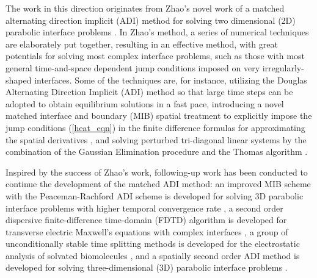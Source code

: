 \documentclass[dissertation]{uathesis}
\begin{document}
\begin{body}
The work in this direction originates from Zhao's novel work of a matched alternating direction implicit (ADI) method for solving two dimensional (2D) parabolic interface problems \cite{zhao2015matched}. In Zhao's method, a series of numerical techniques are elaborately put together, resulting in an effective method, with great potentials for solving most complex interface problems, such as those with most general time-and-space dependent jump conditions imposed on very irregularly-shaped interfaces. Some of the techniques are, for instance, utilizing the Douglas Alternating Direction Implicit (ADI) method \cite{douglas1955-1,douglas1955numerical2} so that large time steps can be adopted to obtain equilibrium solutions in a fast pace, introducing a novel matched interface and boundary (MIB) spatial treatment \cite{zhao2004high,zhou2006high} to explicitly impose the jump conditions (\ref{heat_eqn}) in the finite difference formulas for approximating the spatial derivatives \cite{zhao2015matched}, and solving perturbed tri-diagonal linear systems by the combination of the Gaussian Elimination procedure and the Thomas algorithm \cite{strikwerda2004}.

Inspired by the success of Zhao's work, following-up work has been conducted to continue the development of the matched ADI method: an improved MIB scheme with the Peaceman-Rachford ADI scheme \cite{paeceman1955numerical} is developed for solving 3D parabolic interface problems with higher temporal convergence rate \cite{li2017matched}, a second order dispersive finite-difference time-domain (FDTD) algorithm is developed for transverse electric Maxwell’s equations with complex interfaces \cite{nguyen2016second}, a group of unconditionally stable time splitting methods is developed for the electrostatic analysis of solvated biomolecules \cite{wilson2014}, and a spatially second order ADI method is developed for solving three-dimensional (3D) parabolic interface problems \cite{wei2018spatially}.


\end{body}
\end{document}
